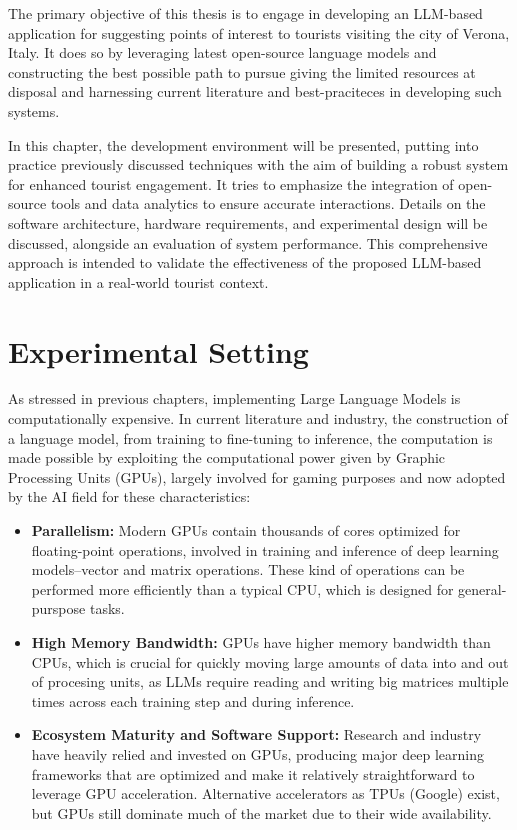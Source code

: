 The primary objective of this thesis is to engage in developing an LLM-based application for suggesting points of interest to tourists visiting the city of Verona, Italy. It does so by leveraging latest open-source language models and constructing the best possible path to pursue giving the limited resources at disposal and harnessing current literature and best-praciteces in developing such systems.

In this chapter, the development environment will be presented, putting into practice previously discussed techniques with the aim of building a robust system for enhanced tourist engagement. It tries to emphasize the integration of open-source tools and data analytics to ensure accurate interactions. Details on the software architecture, hardware requirements, and experimental design will be discussed, alongside an evaluation of system performance. This comprehensive approach is intended to validate the effectiveness of the proposed LLM-based application in a real-world tourist context.


\section{Experimental Setting}
\label{sec:experimental-setting}

As stressed in previous chapters, implementing Large Language Models is computationally expensive. In current literature and industry, the construction of a language model, from training to fine-tuning to inference, the computation is made possible by exploiting the computational power given by Graphic Processing Units (GPUs), largely involved for gaming purposes and now adopted by the AI field for these characteristics: \cite{gyawali2023gpu}

\begin{itemize}
    \item \textbf{Parallelism:} Modern GPUs contain thousands of cores optimized for floating-point operations, involved in training and inference of deep learning models--vector and matrix operations. These kind of operations can be performed more efficiently than a typical CPU, which is designed for general-purspose tasks.
    \item \textbf{High Memory Bandwidth:} GPUs have higher memory bandwidth than CPUs, which is crucial for quickly moving large amounts of data into and out of procesing units, as LLMs require reading and writing big matrices multiple times across each training step and during inference.
    \item \textbf{Ecosystem Maturity and Software Support:} Research and industry have heavily relied and invested on GPUs, producing major deep learning frameworks that are optimized and make it relatively straightforward to leverage GPU acceleration. Alternative accelerators as TPUs (Google) exist, but GPUs still dominate much of the market due to their wide availability.
\end{itemize}

